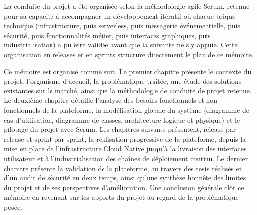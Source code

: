 La conduite du projet a été organisée selon la méthodologie agile Scrum, retenue pour sa capacité à accompagner un développement itératif où chaque brique technique (infrastructure, puis serverless, puis messagerie événementielle, puis sécurité, puis fonctionnalités métier, puis interfaces graphiques, puis industrialisation) a pu être validée avant que la suivante ne s'y appuie. Cette organisation en releases et en sprints structure directement le plan de ce mémoire.

Ce mémoire est organisé comme suit. Le premier chapitre présente le contexte du projet, l'organisme d'accueil, la problématique traitée, une étude des solutions existantes sur le marché, ainsi que la méthodologie de conduite de projet retenue. Le deuxième chapitre détaille l'analyse des besoins fonctionnels et non fonctionnels de la plateforme, la modélisation globale du système (diagramme de cas d'utilisation, diagramme de classes, architecture logique et physique) et le pilotage du projet avec Scrum. Les chapitres suivants présentent, release par release et sprint par sprint, la réalisation progressive de la plateforme, depuis la mise en place de l'infrastructure Cloud Native jusqu'à la livraison des interfaces utilisateur et à l'industrialisation des chaînes de déploiement continu. Le dernier chapitre présente la validation de la plateforme, au travers des tests réalisés et d'un audit de sécurité en deux temps, ainsi qu'une synthèse honnête des limites du projet et de ses perspectives d'amélioration. Une conclusion générale clôt ce mémoire en revenant sur les apports du projet au regard de la problématique posée.
